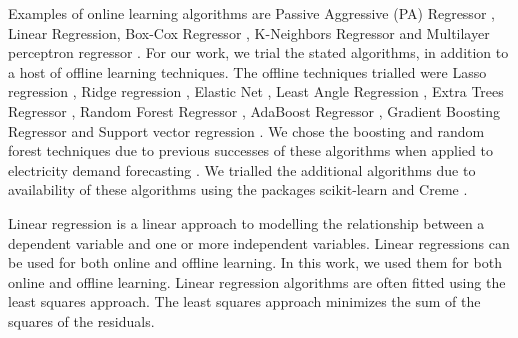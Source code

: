 \documentclass[final,3p,times,twocolumn,numbers]{elsarticle}
\begin{document}



Examples of online learning algorithms are Passive Aggressive (PA) Regressor \cite{Gzik2014}, Linear Regression, Box-Cox Regressor \cite{Box1964}, K-Neighbors Regressor \cite{forgy65} and Multilayer perceptron regressor \cite{Hinton1989}. For our work, we trial the stated algorithms, in addition to a host of offline learning techniques. The offline techniques trialled were Lasso regression \cite{Tibshirani1996a}, Ridge regression \cite{GeladiPaul1994Mrac},  Elastic Net \cite{Geostatistics2010}, Least Angle Regression \cite{Fike1988}, Extra Trees Regressor \cite{Fike1988}, Random Forest Regressor \cite{Breiman2001}, AdaBoost Regressor \cite{Freund1997}, Gradient Boosting Regressor \cite{316} and Support vector regression \cite{Cortes1995}. We chose the boosting and random forest techniques due to previous successes of these algorithms when applied to electricity demand forecasting \cite{Kell2018}. We trialled the additional algorithms due to availability of these algorithms using the packages scikit-learn and Creme \cite{scikit-learn,creme}. %


 Linear regression is a linear approach to modelling the relationship between a dependent variable and one or more independent variables. Linear regressions can be used for both online and offline learning. In this work, we used them for both online and offline learning. Linear regression algorithms are often fitted using the least squares approach. The least squares approach minimizes the sum of the squares of the residuals. 
\end{document}
